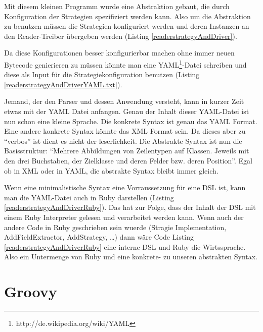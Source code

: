 \documentclass[11pt,english,ngerman, headsepline]{scrreprt}
\begin{document}
Mit diesem kleinen Programm wurde eine Abstraktion gebaut, die durch
Konfiguration der Strategien spezifiziert werden kann.
Also um die Abstraktion zu benutzen müssen die Strategien konfiguriert werden
und deren Instanzen an den Reader-Treiber übergeben werden  (Listing
\ref{readerstrategyAndDriver}).
 



Da diese Konfigurationen besser konfigurierbar machen ohne immer neuen Bytecode
genierieren zu müssen könnte man eine
YAML\footnote{http://de.wikipedia.org/wiki/YAML}-Datei schreiben und diese als
Input für die Strategiekonfiguration benutzen  (Listing
\ref{readerstrategyAndDriverYAML.txt}).
 


Jemand, der den Parser und dessen Anwendung versteht, kann in kurzer Zeit etwas
mit der YAML Datei anfangen. Genau der Inhalt dieser YAML-Datei ist nun schon
eine kleine Sprache. Die konkrete Syntax ist genau das YAML Format. Eine andere
konkrete Syntax könnte das XML Format sein. Da dieses aber zu ``verbos'' ist
dient es nicht der leserlichkeit. Die Abstrakte Syntax ist nun die
Basisstruktur: ``Mehrere Abbildungen von Zeilentypen auf Klassen. Jeweils mit
den drei Buchstaben, der Zielklasse und deren Felder bzw. deren Position''.
Egal ob in XML oder in YAML, die abstrakte Syntax bleibt immer gleich.

Wenn eine minimalistische Syntax eine Vorraussetzung für eine DSL ist, kann man
die YAML-Datei auch in Ruby darstellen (Listing
\ref{readerstrategyAndDriverRuby}). Das hat zur Folge, dass der Inhalt der DSL
mit einem Ruby Interpreter gelesen und verarbeitet werden kann. Wenn auch der andere Code in Ruby geschrieben sein wuerde (Stragie
Implementation, AddFieldExtractor, AddStrategy, \ldots) dann wäre Code Listing
\ref{readerstrategyAndDriverRuby} eine interne DSL und Ruby die Wirtssprache.
Also ein Untermenge von Ruby und eine konkrete- zu unseren abstrakten
Syntax.




\section{Groovy}
\end{document}
